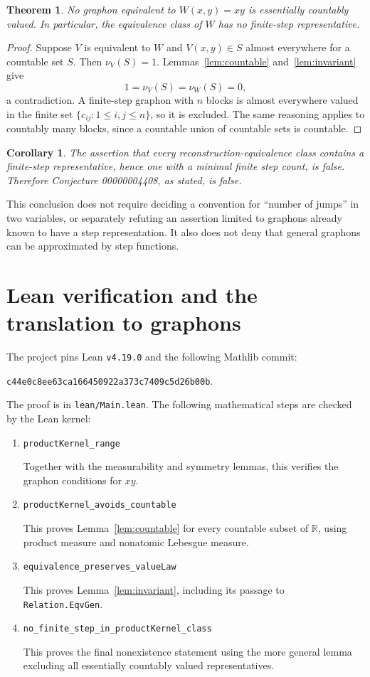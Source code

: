 \documentclass[11pt]{article}
\newtheorem{theorem}{Theorem}
\newtheorem{corollary}{Corollary}
\newcommand{\R}{\mathbb R}
\begin{document}
\begin{theorem}\label{thm:main}
No graphon equivalent to $W(x,y)=xy$ is essentially countably valued.
In particular, the equivalence class of $W$ has no finite-step
representative.
\end{theorem}
\begin{proof}
Suppose $V$ is equivalent to $W$ and $V(x,y)\in S$ almost everywhere for a
countable set $S$. Then $\nu_V(S)=1$. Lemmas~\ref{lem:countable}
and~\ref{lem:invariant} give
\[
 1=\nu_V(S)=\nu_W(S)=0,
\]
a contradiction. A finite-step graphon with $n$ blocks is almost
everywhere valued in the finite set $\{c_{ij}:1\le i,j\le n\}$, so it is
excluded. The same reasoning applies to countably many blocks, since a
countable union of countable sets is countable.
\end{proof}

\begin{corollary}
The assertion that every reconstruction-equivalence class contains a
finite-step representative, hence one with a minimal finite step count,
is false. Therefore Conjecture 00000004408, as stated, is false.
\end{corollary}

This conclusion does not require deciding a convention for ``number of
jumps'' in two variables, or separately refuting an assertion limited to
graphons already known to have a step representation. It also does not
deny that general graphons can be approximated by step functions.

\section{Lean verification and the translation to graphons}
The project pins Lean \texttt{v4.19.0} and the following Mathlib commit:
\par\noindent
\texttt{c44e0c8ee63ca166450922a373c7409c5d26b00b}.
\par
The proof is in \texttt{lean/Main.lean}. The following mathematical steps
are checked by the Lean kernel:
\begin{enumerate}
\item \texttt{productKernel\_range}\par
      Together with the measurability and symmetry lemmas, this verifies
      the graphon conditions for $xy$.
\item \texttt{productKernel\_avoids\_countable}\par
      This proves Lemma~\ref{lem:countable}
      for every countable subset of $\R$, using product measure and
      nonatomic Lebesgue measure.
\item \texttt{equivalence\_preserves\_valueLaw}\par
      This proves Lemma~\ref{lem:invariant}, including its passage to
      \texttt{Relation.EqvGen}.
\item \texttt{no\_finite\_step\_in\_productKernel\_class}\par
      This proves the final nonexistence statement using the more general
      lemma excluding all essentially countably valued representatives.
\end{enumerate}
\end{document}
